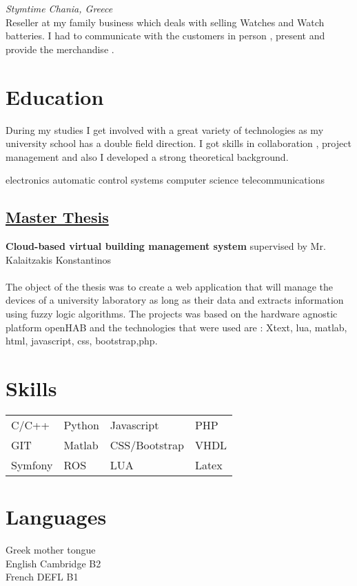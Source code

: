 \documentclass{my_cv}
\begin{document}
\textit{Stymtime  Chania,  Greece}
\\
Reseller at my family business​ which deals with selling Watches and Watch
batteries. I had to communicate with the customers  in person , present and
provide the merchandise .


\section{Education}
During my studies I get involved with a great variety of technologies as my university school
has a double field direction. I got skills in collaboration ,
project management and also I developed a strong theoretical background.


\studyitems
{electronics}
{automatic control systems}
{computer science}
{telecommunications}

	
\subsection{\underline{Master Thesis}}
\textbf {\large{Cloud-based virtual building management system}}
supervised by Mr. Kalaitzakis Konstantinos
\\
\\
The object of the thesis was to create a web application  that will manage the
devices of a university laboratory as long as their data and extracts information
using fuzzy logic algorithms. The projects was based on the hardware agnostic
platform openHAB and the technologies that were used are : Xtext, lua, matlab,
html, javascript, css, bootstrap,php.	
	
 	\section{Skills}
 	\begin{tabular}{l l l l}
 		C/C++ & Python & Javascript & PHP \\
 		GIT & Matlab & CSS/Bootstrap & VHDL\\
 		Symfony & ROS & LUA & Latex
 	\end{tabular}
 
\section{Languages}
Greek mother tongue\\ English  Cambridge B2\\ French DEFL B1  
\end{document}
